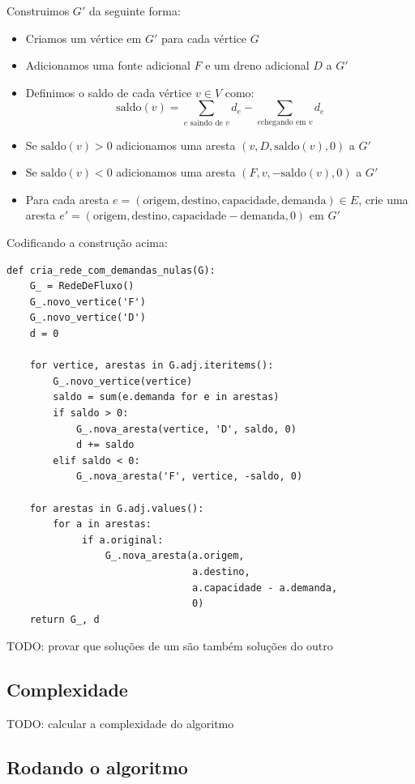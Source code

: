 \documentclass[11pt]{article}
\begin{document}
Construimos $G'$ da seguinte forma:

\begin{itemize}
\item Criamos um vértice em $G'$ para cada vértice $G$
\item Adicionamos uma fonte adicional $F$ e um dreno adicional $D$ a $G'$
\item Definimos o saldo de cada vértice $v \in V$ como: \[
  \textrm{saldo}(v) = \sum_{e \text{ saindo de }v}d_e - \sum_{e \text{
  chegando em }v}d_e \]
\item Se $\mathrm{saldo}(v) > 0$ adicionamos uma aresta $(v, D,
  \mathrm{saldo}(v), 0)$ a $G'$
\item Se $\mathrm{saldo}(v) < 0$ adicionamos uma aresta $(F, v,
  -\mathrm{saldo}(v), 0)$ a $G'$
\item Para cada aresta $e = (\mathrm{origem, destino, capacidade,
  demanda}) \in E$, crie uma aresta $e' = (\mathrm{origem, destino,
  capacidade - demanda, 0})$ em $G'$
\end{itemize}

Codificando a construção acima:
\begin{verbatim}
def cria_rede_com_demandas_nulas(G):
    G_ = RedeDeFluxo()
    G_.novo_vertice('F')
    G_.novo_vertice('D')
    d = 0

    for vertice, arestas in G.adj.iteritems():
        G_.novo_vertice(vertice)
        saldo = sum(e.demanda for e in arestas)
        if saldo > 0:
            G_.nova_aresta(vertice, 'D', saldo, 0)
            d += saldo
        elif saldo < 0:
            G_.nova_aresta('F', vertice, -saldo, 0)

    for arestas in G.adj.values():
        for a in arestas:
             if a.original:
                 G_.nova_aresta(a.origem,
                                a.destino,
                                a.capacidade - a.demanda,
                                0)
    return G_, d
\end{verbatim}

TODO: provar que soluções de um são também soluções do outro


\subsection{Complexidade}
\label{sec-1-5}

TODO: calcular a complexidade do algoritmo

\subsection{Rodando o algoritmo}
\label{sec-1-6}
\end{document}
